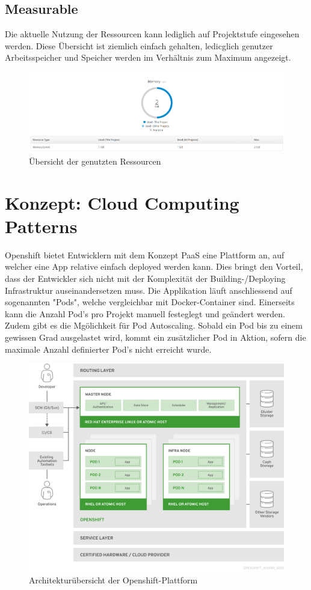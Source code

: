 \documentclass[12pt,a4paper]{article}
\begin{document}
\subsection{Measurable}

Die aktuelle Nutzung der Ressourcen kann lediglich auf Projektstufe eingesehen werden. Diese Übersicht ist ziemlich einfach gehalten, ledicglich genutzer Arbeitsspeicher und Speicher werden im Verhältnis zum Maximum angezeigt.

\begin{figure}[h]
	\centering
	\includegraphics[width=0.7\linewidth]{img/os-quota}
	\caption{Übersicht der genutzten Ressourcen}
	\label{fig:os-quota}
\end{figure}

\section{Konzept: Cloud Computing Patterns}

Openshift bietet Entwicklern mit dem Konzept PaaS eine Plattform an, auf welcher eine App relative einfach deployed werden kann. Dies bringt den Vorteil, dass der Entwickler sich nicht mit der Komplexität der Building-/Deploying Infrastruktur auseinandersetzen muss.
Die Applikation läuft anschliessend auf sogenannten "Pods", welche vergleichbar mit Docker-Container sind. Einerseits kann die Anzahl Pod's pro Projekt manuell festeglegt und geändert werden. Zudem gibt es die Mgölichkeit für Pod Autoscaling. Sobald ein Pod bis zu
einem gewissen Grad ausgelastet wird, kommt ein zusätzlicher Pod in Aktion, sofern die maximale Anzahl definierter Pod's nicht erreicht wurde.

\begin{figure}[h]
	\centering
	\includegraphics[width=0.7\linewidth]{img/os-architecture}
	\caption{Architekturübersicht der Openshift-Plattform}
	\label{fig:os-architecture}
\end{figure}
\end{document}
